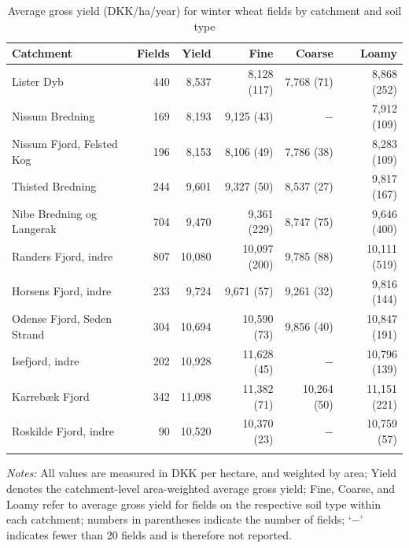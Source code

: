 \documentclass[12pt]{article}
\begin{document}
\begin{table}[H]
\centering
\small
\caption{Average gross yield (DKK/ha/year) for winter wheat fields by catchment and soil type}
\label{tab:yield-vinterhvede}
\begin{threeparttable}
\begin{tabular}{lrrrrr}
\toprule
\textbf{Catchment} & \textbf{Fields} & \textbf{Yield} & \textbf{Fine} &
\textbf{Coarse} & \textbf{Loamy} \\
\midrule\addlinespace
Lister Dyb                 & 440 & 8,537  & 8,128 (117)  & 7,768 (71)   & 8,868 (252) \\
Nissum Bredning            & 169 & 8,193  & 9,125 (43)   & $-$           & 7,912 (109) \\
Nissum Fjord, Felsted Kog  & 196 & 8,153  & 8,106 (49)   & 7,786 (38)   & 8,283 (109) \\
Thisted Bredning           & 244 & 9,601  & 9,327 (50)   & 8,537 (27)   & 9,817 (167) \\
Nibe Bredning og Langerak  & 704 & 9,470  & 9,361 (229)  & 8,747 (75)   & 9,646 (400) \\
Randers Fjord, indre       & 807 & 10,080 & 10,097 (200) & 9,785 (88)   & 10,111 (519) \\
Horsens Fjord, indre       & 233 & 9,724  & 9,671 (57)   & 9,261 (32)   & 9,816 (144) \\
Odense Fjord, Seden Strand & 304 & 10,694 & 10,590 (73)  & 9,856 (40)   & 10,847 (191) \\
Isefjord, indre            & 202 & 10,928 & 11,628 (45)  & $-$           & 10,796 (139) \\
Karrebæk Fjord             & 342 & 11,098 & 11,382 (71)  & 10,264 (50)  & 11,151 (221) \\
Roskilde Fjord, indre      &  90 & 10,520 & 10,370 (23)  & $-$           & 10,759 (57) \\
\addlinespace\bottomrule
\end{tabular}
\begin{tablenotes}
\footnotesize
\item \textit{Notes:} All values are measured in DKK per hectare, and weighted by area;
Yield denotes the catchment-level area-weighted average gross yield;
Fine, Coarse, and Loamy refer to average gross yield for fields on the respective
soil type within each catchment; numbers in parentheses indicate the number of
fields; `$-$' indicates fewer than 20 fields and is therefore not reported.
\end{tablenotes}
\end{threeparttable}
\end{table}
\end{document}
